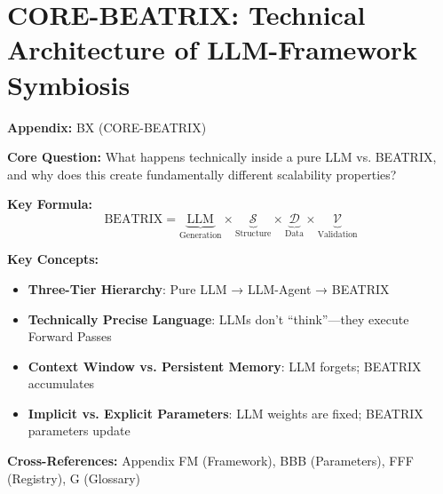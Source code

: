 \chapter{CORE-BEATRIX: Technical Architecture of LLM-Framework Symbiosis}
\label{app:core-beatrix}


\begin{tcolorbox}[colback=blue!5!white, colframe=blue!75!black,
    title=Quick Reference: Appendix BX]

\textbf{Appendix:} BX (CORE-BEATRIX)

\textbf{Core Question:} What happens technically inside a pure LLM vs. BEATRIX, and why does this create fundamentally different scalability properties?

\textbf{Key Formula:}
\begin{equation}
\text{BEATRIX} = \underbrace{\text{LLM}}_{\text{Generation}} \times \underbrace{\mathcal{S}}_{\text{Structure}} \times \underbrace{\mathcal{D}}_{\text{Data}} \times \underbrace{\mathcal{V}}_{\text{Validation}}
\label{eq:bx-core}
\end{equation}

\textbf{Key Concepts:}
\begin{itemize}[nosep]
\item \textbf{Three-Tier Hierarchy}: Pure LLM → LLM-Agent → BEATRIX
\item \textbf{Technically Precise Language}: LLMs don't ``think''---they execute Forward Passes
\item \textbf{Context Window vs. Persistent Memory}: LLM forgets; BEATRIX accumulates
\item \textbf{Implicit vs. Explicit Parameters}: LLM weights are fixed; BEATRIX parameters update
\end{itemize}

\textbf{Cross-References:} Appendix FM (Framework), BBB (Parameters), FFF (Registry), G (Glossary)
\end{tcolorbox}


\begin{abstract}
This appendix provides a technically rigorous explanation of the architectural differences between a pure Large Language Model (LLM) and BEATRIX (EBF + LLM). We introduce a \textbf{three-tier hierarchy}---Pure LLM → LLM-Agent → BEATRIX---and analyze what happens at each processing layer using \textbf{technically precise, non-anthropomorphic language} (LLMs execute Forward Passes, not ``thinking''). We identify seven fundamental asymmetries that create different scalability properties. The core insight: LLMs are \textit{stateless pattern matchers}; LLM-Agents add tool use but remain stateless; BEATRIX adds structure, data, validation, and persistence to become a \textit{stateful knowledge system}. This distinction explains why consulting insights disappear while BEATRIX knowledge accumulates.
\end{abstract}


